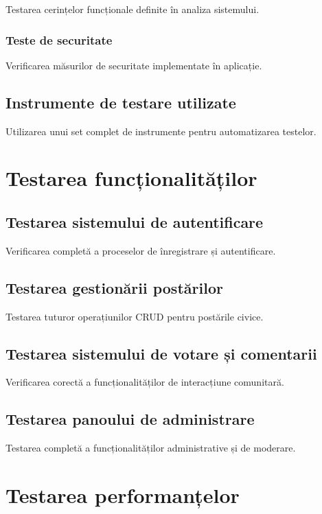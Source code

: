 \documentclass[12pt,a4paper]{report}
\begin{document}
Testarea cerințelor funcționale definite în analiza sistemului.

\subsubsection{Teste de securitate}

Verificarea măsurilor de securitate implementate în aplicație.

\subsection{Instrumente de testare utilizate}

Utilizarea unui set complet de instrumente pentru automatizarea testelor.

\section{Testarea funcționalităților}

\subsection{Testarea sistemului de autentificare}

Verificarea completă a proceselor de înregistrare și autentificare.

\subsection{Testarea gestionării postărilor}

Testarea tuturor operațiunilor CRUD pentru postările civice.

\subsection{Testarea sistemului de votare și comentarii}

Verificarea corectă a funcționalităților de interacțiune comunitară.

\subsection{Testarea panoului de administrare}

Testarea completă a funcționalităților administrative și de moderare.

\section{Testarea performanțelor}
\end{document}
